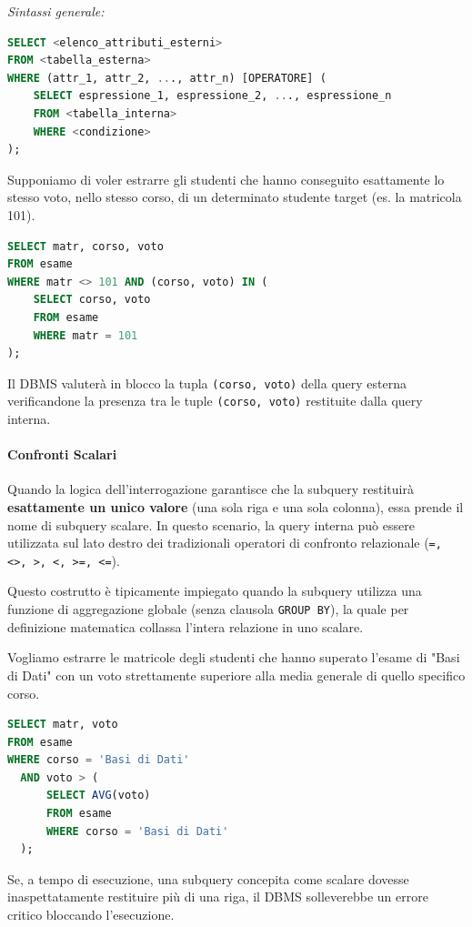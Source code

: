 \textit{Sintassi generale:}
\begin{lstlisting}[language=SQL, basicstyle=\ttfamily\small, keywordstyle=\color{blue}\bfseries]
SELECT <elenco_attributi_esterni>
FROM <tabella_esterna>
WHERE (attr_1, attr_2, ..., attr_n) [OPERATORE] (
    SELECT espressione_1, espressione_2, ..., espressione_n
    FROM <tabella_interna>
    WHERE <condizione>
);
\end{lstlisting}

\begin{example}
Supponiamo di voler estrarre gli studenti che hanno conseguito esattamente lo stesso voto, nello stesso corso, di un determinato studente target (es. la matricola 101).

\begin{lstlisting}[language=SQL, basicstyle=\ttfamily\small, keywordstyle=\color{blue}\bfseries]
SELECT matr, corso, voto
FROM esame
WHERE matr <> 101 AND (corso, voto) IN (
    SELECT corso, voto
    FROM esame
    WHERE matr = 101
);
\end{lstlisting}
Il DBMS valuterà in blocco la tupla \texttt{(corso, voto)} della query esterna verificandone la presenza tra le tuple \texttt{(corso, voto)} restituite dalla query interna.
\end{example}

\paragraph{Confronti Scalari}

Quando la logica dell'interrogazione garantisce che la subquery restituirà \textbf{esattamente un unico valore} (una sola riga e una sola colonna), essa prende il nome di subquery scalare. In questo scenario, la query interna può essere utilizzata sul lato destro dei tradizionali operatori di confronto relazionale (\texttt{=, <>, >, <, >=, <=}).

Questo costrutto è tipicamente impiegato quando la subquery utilizza una funzione di aggregazione globale (senza clausola \texttt{GROUP BY}), la quale per definizione matematica collassa l'intera relazione in uno scalare.

\begin{example}
Vogliamo estrarre le matricole degli studenti che hanno superato l'esame di "Basi di Dati" con un voto strettamente superiore alla media generale di quello specifico corso.
\begin{lstlisting}[language=SQL, basicstyle=\ttfamily\small, keywordstyle=\color{blue}\bfseries]
SELECT matr, voto
FROM esame
WHERE corso = 'Basi di Dati' 
  AND voto > (
      SELECT AVG(voto)
      FROM esame
      WHERE corso = 'Basi di Dati'
  );
\end{lstlisting}
Se, a tempo di esecuzione, una subquery concepita come scalare dovesse inaspettatamente restituire più di una riga, il DBMS solleverebbe un errore critico bloccando l'esecuzione.
\end{example}

